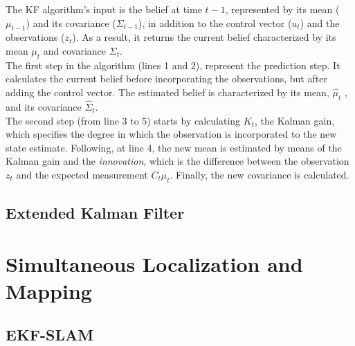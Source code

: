 The KF algorithm's input is the belief at time $t-1$, represented by its mean ($\mu_{t-1}$) and its covariance ($\Sigma_{t-1}$), in addition to the control vector ($u_t$) and the observations ($z_t$). As a result, it returns the current belief characterized by its mean $\mu_t$ and covariance $\Sigma_t$. \\

The first step in the algorithm (lines 1 and 2), represent the prediction step. It calculates the current belief before incorporating the observations, but after adding the control vector. The estimated belief is characterized by its mean, $\hat\mu_t$ , and its covariance $\hat\Sigma_t$.\\

The second step (from line 3 to 5) starts by calculating $K_t$, the Kalman gain, which specifies the degree in which the observation is incorporated to the new state estimate. Following, at line 4, the new mean is estimated by means of the Kalman gain and the \emph{innovation}, which is the difference between the observation $z_t$ and the expected measurement $C_t \hat\mu_t$. Finally, the new covariance is calculated. \\

\subsection{Extended Kalman Filter}

\section{Simultaneous Localization and Mapping}

\subsection{EKF-SLAM}